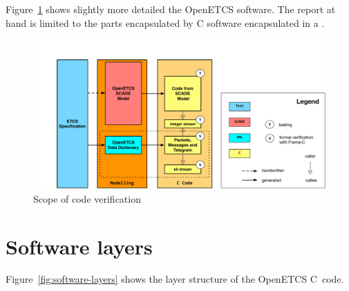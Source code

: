 Figure~\ref{fig:scope-of-code-verification} shows slightly more detailed
the OpenETCS software.
The report at hand is limited to the parts encapsulated by C software encapsulated 
in a .

\clearpage

\begin{figure}[hbt]
\begin{center}
\includegraphics[width=0.95\textheight,angle=90]{figures/OpenETCS-Stack.pdf}
\caption{\label{fig:scope-of-code-verification} Scope of code verification}
\end{center}
\end{figure}

\FloatBarrier

\section{Software layers}

Figure~\ref{fig:software-layers} shows the layer structure of the OpenETCS C~code.

